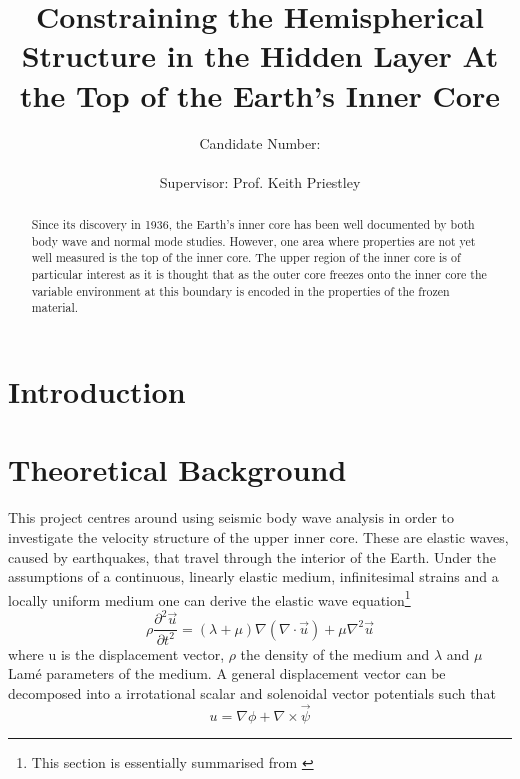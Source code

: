 \documentclass[11pt,a4paper]{article}
\begin{document}
\title{Constraining the Hemispherical Structure in the Hidden Layer At the Top of the Earth's Inner Core}
\author{Candidate Number: \\  \\ Supervisor: Prof. Keith Priestley}
\maketitle

\begin{abstract}
Since its discovery in 1936, the Earth's inner core has been well documented by both body wave and normal mode studies. However, one area where properties are not yet well measured is the top of the inner core. The upper region of the inner core is of particular interest as it is thought that as the outer core freezes onto the inner core the variable environment at this boundary is encoded in the properties of the frozen material. 
\end{abstract}

\tableofcontents

\newpage
\section{Introduction}

\section{Theoretical Background}
This project centres around using seismic body wave analysis in order to investigate the velocity structure of the upper inner core. These are elastic waves, caused by earthquakes, that travel through the interior of the Earth. Under the assumptions of a continuous, linearly elastic medium, infinitesimal strains and a locally uniform medium one can derive the elastic wave equation\footnote{This section is essentially summarised from \cite{Shearer2009}}
\begin{equation}
	\rho \frac{\partial^{2} \vec{u}}{\partial t^{2}} = \left ( \lambda + \mu \right ) \nabla \left ( \nabla \cdot \vec{u} \right ) + \mu \nabla^{2} \vec{u}
	\label{eq:Wave Equation}
\end{equation}
where u is the displacement vector, $\rho$ the density of the medium and $\lambda$ and $\mu$  Lam\'{e} parameters of the medium. A general displacement vector can be decomposed into a irrotational scalar and solenoidal vector potentials such that
\begin{equation}
	u = \nabla \phi + \nabla \times \vec{\psi}
	\label{eq:Displacement}
\end{equation}
\end{document}
